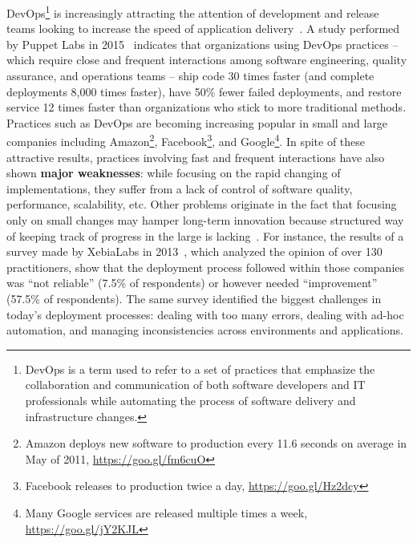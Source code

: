 \documentclass[12pt]{article}
\begin{document}
 DevOps\footnote{DevOps is a term used to refer to a set of practices that emphasize the collaboration and communication of both software developers and IT professionals while automating the process of software delivery and infrastructure changes.} is increasingly attracting the attention of development and release teams looking to increase the speed of application delivery~\cite{Bass2015}.
A study performed by Puppet Labs in 2015~\cite{PuppetLab2015} indicates that organizations using DevOps practices -- which require close and frequent interactions among software engineering, quality assurance, and operations teams -- ship code 30 times faster (and complete deployments 8,000 times faster), have 50\% fewer failed deployments, and restore service 12 times faster than organizations who stick to more traditional methods.
Practices such as DevOps are becoming increasing popular in small and large companies including Amazon\footnote{Amazon deploys new software to production every 11.6 seconds on average in May of 2011, \url{https://goo.gl/fm6cuO}},  %
Facebook\footnote{Facebook releases to production twice a day, \url{https://goo.gl/Hz2dcy}},  
and Google\footnote{Many Google services are released multiple times a week, \url{https://goo.gl/jY2KJL}}. 
In spite of these attractive results, practices involving fast and frequent interactions have also shown {\bf major weaknesses}: while focusing on the rapid changing of implementations, they suffer from a lack of control of software quality, performance, scalability, etc.
Other problems originate in the fact that focusing only on small changes may hamper long-term innovation because structured way of keeping track of progress in the large is lacking~\cite{TurkFR14a}.
For instance, the results of a survey made by XebiaLabs in 2013~\cite{Bass2015}, which analyzed the opinion of over 130 practitioners, show that the deployment process followed within those companies was ``not reliable'' (7.5\% of respondents) or however needed ``improvement'' (57.5\% of respondents).
The same survey identified the biggest challenges in today's deployment processes: dealing with too many errors, dealing with ad-hoc automation, and managing inconsistencies across environments and applications.
\end{document}
